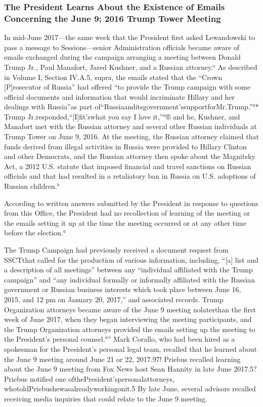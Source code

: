 \subsubsection{The President Learns About the Existence of Emails Concerning the June 9; 2016 Trump Tower Meeting}

In mid-June 2017—the same week that the President first asked Lewandowski to pass a message to Sessions—senior Administration officials became aware of emails exchanged during the campaign arranging a meeting between Donald Trump Jr., Paul Manafort, Jared Kushner, and a Russian attorney.“
As described in Volume I, Section IV.A.5, supra, the emails stated that the “Crown [P]rosecutor of Russia” had offered “to provide the Trump campaign with some official documents and information that would incriminate Hillary and her dealings with Russia”as part of“Russiaanditsgovernment'ssupportforMr.Trump.”°*
Trump Jr.responded,“[I]fit'swhat you say I love it,”°® and he, Kushner, and Manafort met with the Russian attorney and several other Russian individuals at Trump Tower on June 9, 2016.%
At the meeting, the Russian attorney claimed that funds derived from illegal activities in Russia were provided to Hillary Clinton and other Democrats, and the Russian attorney then spoke about the Magnitsky Act, a 2012 U.S. statute that imposed financial and travel sanctions on Russian officials and that had resulted in a retaliatory ban in Russia on U.S. adoptions of Russian children.°

According to written answers submitted by the President in response to questions from this Office, the President had no recollection of learning of the meeting or the emails setting it up at the time the meeting occurred or at any other time before the election.°

The Trump Campaign had previously received a document request from SSCTthat called for the production of various information, including, “[a] list and a description of all meetings” between any “individual affiliated with the Trump campaign” and “any individual formally or informally affiliated with the Russian government or Russian business interests which took place between June 16, 2015, and 12 pm on January 20, 2017,” and associated records.%
Trump Organization attorneys became aware of the June 9 meeting nolaterthan the first week of June 2017, when they began interviewing the meeting participants, and the Trump Organization attorneys provided the emails setting up the meeting to the President's personal counsel.°”
Mark Corallo, who had been hired as a spokesman for the President's personal legal team, recalled that he learned about the June 9 meeting around June 21 or 22, 2017.97!
Priebus recalled learning about the June 9 meeting from Fox News host Sean Hannity in late June 2017.5? Priebus notified one ofthePresident'spersonalattorneys, whotoldPriebushewasalreadyworkingonit.5
By late June, several advisors recalled receiving media inquiries that could relate to the June 9 meeting. %

